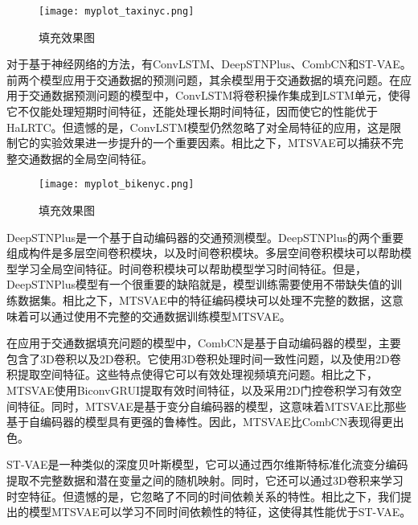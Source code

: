 \begin{figure}[htbp] 
\centering
\texttt{[image: myplot\_taxinyc.png]}
\vspace{-1em}
\caption{填充效果图 \label{impute}}
\end{figure}

对于基于神经网络的方法，有ConvLSTM、DeepSTNPlus、CombCN和ST-VAE。前两个模型应用于交通数据的预测问题，其余模型用于交通数据的填充问题。在应用于交通数据预测问题的模型中，ConvLSTM将卷积操作集成到LSTM单元，使得它不仅能处理短期时间特征，还能处理长期时间特征，因而使它的性能优于HaLRTC。但遗憾的是，ConvLSTM模型仍然忽略了对全局特征的应用，这是限制它的实验效果进一步提升的一个重要因素。相比之下，MTSVAE可以捕获不完整交通数据的全局空间特征。

\begin{figure}[htbp] 
\centering
\texttt{[image: myplot\_bikenyc.png]}
\vspace{-1em}
\caption{填充效果图 \label{impute}}
\end{figure}

DeepSTNPlus是一个基于自动编码器的交通预测模型。DeepSTNPlus的两个重要组成构件是多层空间卷积模块，以及时间卷积模块。多层空间卷积模块可以帮助模型学习全局空间特征。时间卷积模块可以帮助模型学习时间特征。但是，DeepSTNPlus模型有一个很重要的缺陷就是，模型训练需要使用不带缺失值的训练数据集。相比之下，MTSVAE中的特征编码模块可以处理不完整的数据，这意味着可以通过使用不完整的交通数据训练模型MTSVAE。

在应用于交通数据填充问题的模型中，CombCN是基于自动编码器的模型，主要包含了3D卷积以及2D卷积。它使用3D卷积处理时间一致性问题，以及使用2D卷积提取空间特征。这些特点使得它可以有效处理视频填充问题。相比之下，MTSVAE使用BiconvGRUI提取有效时间特征，以及采用2D门控卷积学习有效空间特征。同时，MTSVAE是基于变分自编码器的模型，这意味着MTSVAE比那些基于自编码器的模型具有更强的鲁棒性。因此，MTSVAE比CombCN表现得更出色。

ST-VAE是一种类似的深度贝叶斯模型，它可以通过西尔维斯特标准化流变分编码提取不完整数据和潜在变量之间的随机映射。同时，它还可以通过3D卷积来学习时空特征。但遗憾的是，它忽略了不同的时间依赖关系的特性。相比之下，我们提出的模型MTSVAE可以学习不同时间依赖性的特征，这使得其性能优于ST-VAE。

